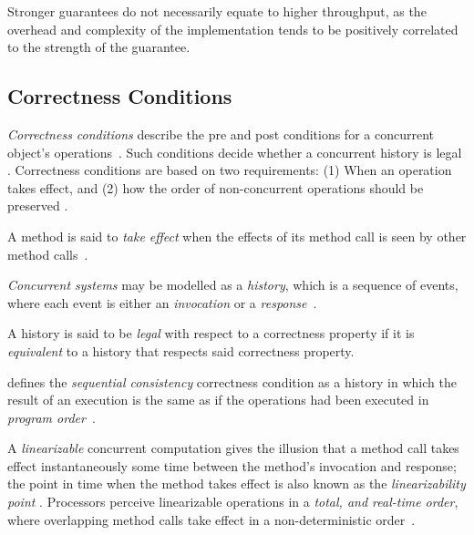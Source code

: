 Stronger guarantees do not necessarily equate to higher throughput, as the
overhead and complexity of the implementation tends to be positively
correlated to the strength of the guarantee.

\subsection{Correctness Conditions}
\label{sec:correctness_conditions}
\emph{Correctness conditions} describe the pre and post conditions for a concurrent
object's operations~\citep{herlihy2020art}. Such conditions decide
whether a concurrent history is legal \citep{herlihy1990linearizability}.
Correctness conditions are based on two requirements: (1) When an
operation takes effect, and (2) how the order of non-concurrent operations
should be preserved \citep{herlihy1990linearizability}.

A method is said to \emph{take effect} when the effects of its method call is
seen by other method calls~\citep[Section~3.4.1]{herlihy2020art}. 

\emph{Concurrent systems} may be modelled as a \emph{history}, which is a
sequence of events, where each event is either an \emph{invocation} or a
\emph{response}~\citep[Section~3.6.1]{herlihy2020art}. 

A history is said to be \emph{legal} with respect to a correctness property if
it is \emph{equivalent} to a history that respects said correctness property.

\citeauthor{lamport1979make} defines the \emph{sequential consistency}
correctness condition as a history in which the result of an execution is the
same as if the operations had been executed in \emph{program
order}~\citep{lamport1979make}.

A \emph{linearizable} concurrent computation gives the illusion that a method
call takes effect instantaneously some time between the method's invocation and
response; the point in time when the method takes effect is also known as the
\emph{linearizability point} \citep{herlihy2020art,herlihy1990linearizability}.
Processors perceive linearizable operations in a \emph{total, and real-time
order}, where overlapping method calls take effect in a non-deterministic
order~\citep[Section~3.6.2]{herlihy2020art}.



